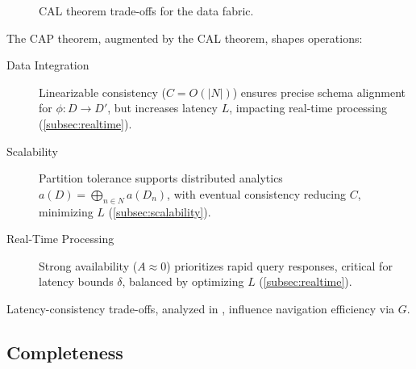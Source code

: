 \documentclass{amsart}
\begin{document}
\begin{figure}[h!]
    \centering
    \caption{CAL theorem trade-offs for the data fabric.}
    \label{fig:cal_tradeoffs}
\end{figure}


The CAP theorem, augmented by the CAL theorem, shapes operations:
\begin{description}
    \item[Data Integration] Linearizable consistency (\( C = O(|N|) \)) ensures precise schema alignment for \( \phi: D \to D' \), but increases latency \( L \), impacting real-time processing (\cref{subsec:realtime}).
    \item[Scalability] Partition tolerance supports distributed analytics \( a(D) = \bigoplus_{n \in N} a(D_n) \), with eventual consistency reducing \( C \), minimizing \( L \) (\cref{subsec:scalability}).
    \item[Real-Time Processing] Strong availability (\( A \approx 0 \)) prioritizes rapid query responses, critical for latency bounds \( \delta \), balanced by optimizing \( L \) (\cref{subsec:realtime}).
\end{description}
Latency-consistency trade-offs, analyzed in \cite{Abadi2010,Lee2023}, influence navigation efficiency via \( G \).


\subsection{Completeness} \label{subsubsec:completeness}
\end{document}
